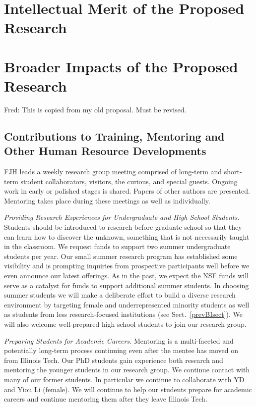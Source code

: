 \documentclass[11pt]{NSFamsart}
\newcommand{\FJHNote}[1]{{\color{blue}Fred: #1}}
\begin{document}
\section{Intellectual Merit of the Proposed Research} \label{sec:Proposed}




\section{Broader Impacts of the Proposed Research}\label{SectBroad}
\FJHNote{This is copied from my old proposal.  Must be revised.}


\subsection{Contributions to Training, Mentoring and Other Human Resource Developments}
FJH leads a weekly research group meeting comprised of long-term and short-term student 
collaborators, visitors, the curious, and special guests.  Ongoing work in early or polished stages is shared.  Papers of other authors are presented.  Mentoring takes place during these meetings as well as individually.

\emph{Providing Research Experiences for Undergraduate and High School Students.} Students 
should be introduced to research before graduate school so that they can learn how to 
discover the unknown, something that is not necessarily taught in the classroom. We request funds 
to 
support two summer undergraduate students per year.  Our small summer research program has established some visibility 
and is prompting inquiries from prospective participants well before we 
even announce our latest 
offerings. As in the past, we expect the NSF funds will serve as a catalyst for funds to 
support additional summer students. In choosing summer students we will make a deliberate effort to 
build 
a diverse research environment by targeting female and underrepresented minority students as well 
as students from less research-focused institutions (see Sect.~\ref{prevBIsect}). We will also 
welcome well-prepared high school students to join our research group.

\emph{Preparing Students for Academic Careers.} Mentoring is a multi-faceted and 
potentially long-term process continuing even after the mentee has moved on from Illinois Tech.  
Our PhD students gain experience both research and mentoring the younger students in our 
research group.  We 
continue contact with many of our former students.  In particular we continue to 
collaborate with YD and Yiou Li (female).  We will continue to help our students prepare for 
academic careers and continue mentoring them after they leave Illinois Tech.
\end{document}
